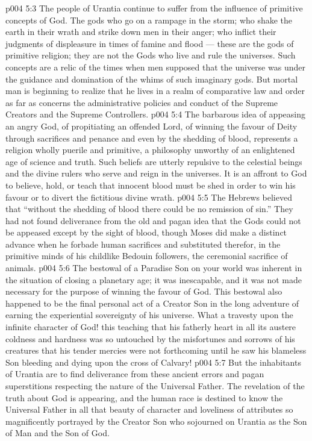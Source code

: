\vs p004 5:3 \pc The people of Urantia continue to suffer from the influence of primitive concepts of God. The gods who go on a rampage in the storm; who shake the earth in their wrath and strike down men in their anger; who inflict their judgments of displeasure in times of famine and flood --- these are the gods of primitive religion; they are not the Gods who live and rule the universes. Such concepts are a relic of the times when men supposed that the universe was under the guidance and domination of the whims of such imaginary gods. But mortal man is beginning to realize that he lives in a realm of comparative law and order as far as concerns the administrative policies and conduct of the Supreme Creators and the Supreme Controllers.
\vs p004 5:4 \pc The barbarous idea of appeasing an angry God, of propitiating an offended Lord, of winning the favour of Deity through sacrifices and penance and even by the shedding of blood, represents a religion wholly puerile and primitive, a philosophy unworthy of an enlightened age of science and truth. Such beliefs are utterly repulsive to the celestial beings and the divine rulers who serve and reign in the universes. It is an affront to God to believe, hold, or teach that innocent blood must be shed in order to win his favour or to divert the fictitious divine wrath.
\vs p004 5:5 The Hebrews believed that “without the shedding of blood there could be no remission of sin.” They had not found deliverance from the old and pagan idea that the Gods could not be appeased except by the sight of blood, though Moses did make a distinct advance when he forbade human sacrifices and substituted therefor, in the primitive minds of his childlike Bedouin followers, the ceremonial sacrifice of animals.
\vs p004 5:6 The bestowal of a Paradise Son on your world was inherent in the situation of closing a planetary age; it was inescapable, and it was not made necessary for the purpose of winning the favour of God. This bestowal also happened to be the final personal act of a Creator Son in the long adventure of earning the experiential sovereignty of his universe. What a travesty upon the infinite character of God! this teaching that his fatherly heart in all its austere coldness and hardness was so untouched by the misfortunes and sorrows of his creatures that his tender mercies were not forthcoming until he saw his blameless Son bleeding and dying upon the cross of Calvary!
\vs p004 5:7 But the inhabitants of Urantia are to find deliverance from these ancient errors and pagan superstitions respecting the nature of the Universal Father. The revelation of the truth about God is appearing, and the human race is destined to know the Universal Father in all that beauty of character and loveliness of attributes so magnificently portrayed by the Creator Son who sojourned on Urantia as the Son of Man and the Son of God.
